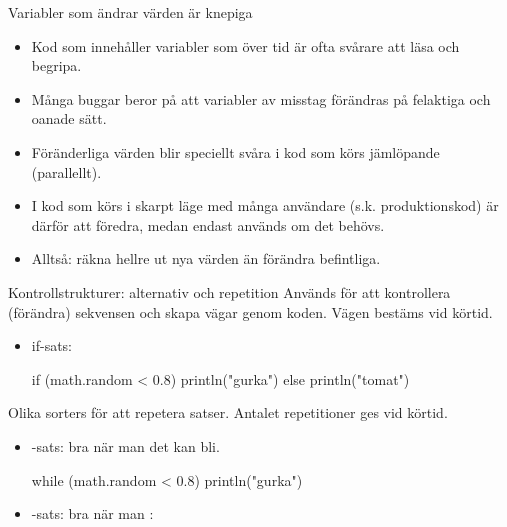 \documentclass{simpleslides}
\begin{document}
    
    
\begin{Slide}{Variabler som ändrar värden är knepiga}
\begin{itemize}
\item Kod som innehåller variabler som  över tid är ofta svårare att läsa och begripa.

\item Många buggar beror på att variabler av misstag förändras på felaktiga och oanade sätt.

\item Föränderliga värden blir speciellt svåra i kod som körs jämlöpande (parallellt).

\item I kod som körs i skarpt läge med många användare (s.k. produktionskod) är därför  att föredra, medan  endast används om det  behövs.
\item Alltså: räkna hellre ut nya värden än förändra befintliga.
\end{itemize}
\end{Slide}
    
    
    
\begin{Slide}{Kontrollstrukturer: alternativ och repetition}\SlideFontSmall
Används för att kontrollera (förändra) sekvensen och skapa  vägar genom koden. Vägen  bestäms vid körtid.
\begin{itemize}
\item if-sats:
\begin{Code}
if (math.random < 0.8) println("gurka") else println("tomat")
\end{Code}
\end{itemize}

Olika sorters  för att repetera satser. Antalet repetitioner ges vid körtid.
\begin{itemize}
\item {}-sats: bra när man  det kan bli.
\begin{Code}
while (math.random < 0.8) println("gurka")
\end{Code}

\item {}-sats: bra när man :

\end{itemize}
\end{Slide}
    
\end{document}
